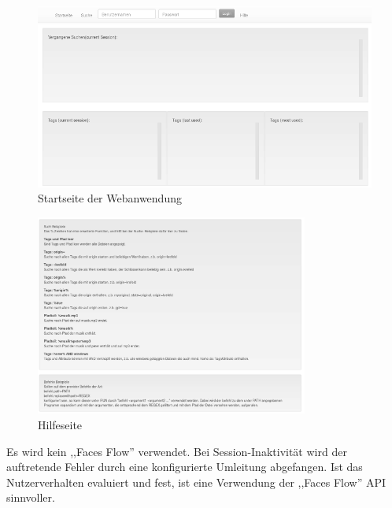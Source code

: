 \documentclass[oneside, ngerman, toc=bibliography,bibliography=totoc,listof=entryprefix, open=right,numbers=noenddot,fontsize=12pt]{scrbook}
\begin{document}
\begin{figure}[htbp] 
    \centering
    \includegraphics[width=\textwidth]{Masterarbeit_Bilder/www_startseite.png}
    \caption{Startseite der Webanwendung}
    \label{fig:www-start}
\end{figure}  



\begin{figure}[htbp] 
    \centering
    \includegraphics[width=0.8\textwidth]{Masterarbeit_Bilder/www_help.png}
    \caption{Hilfeseite}
    \label{fig:www-help}
\end{figure}  




Es wird kein ,,Faces Flow'' verwendet. Bei Session-Inaktivität wird der auftretende Fehler durch eine konfigurierte Umleitung abgefangen. Ist das Nutzerverhalten evaluiert und fest, ist eine Verwendung der ,,Faces Flow'' API sinnvoller.
\end{document}
